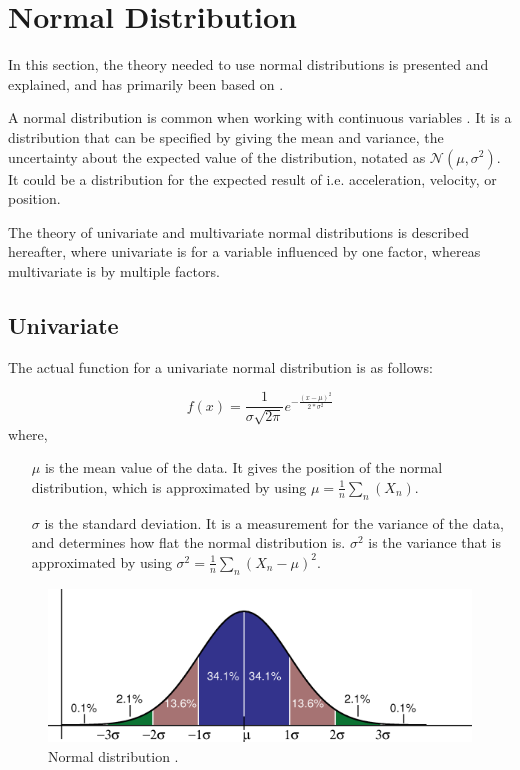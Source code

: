 \section{Normal Distribution}\label{section:normal-distribution}
In this section, the theory needed to use normal distributions is presented and explained, and has primarily been based on \citet{article:Lauritzen, article:thiesson}.

A normal distribution is common when working with continuous variables \citep{misc:artificial-intelligence}. 
It is a distribution that can be specified by giving the mean and variance, the uncertainty about the expected value of the distribution, notated as $\mathcal{N}(\mu, \sigma^2)$. 
It could be a distribution for the expected result of i.e. acceleration, velocity, or position.

The theory of univariate and multivariate normal distributions is described hereafter, where univariate is for a variable influenced by one factor, whereas multivariate is by multiple factors. 

\subsection{Univariate}
The actual function for a univariate normal distribution is as follows:

\begin{equation}\label{eq:normaldist}
	f(x) = \frac{1}{\sigma \sqrt{2\pi}}e^{-\frac{(x - \mu)^2}{2 * \sigma^2}}
\end{equation}
where, 
\begin{itemize}
	\item[$\mu$] is the mean value of the data. It gives the position of the normal distribution, which is approximated by using $\mu = \frac{1}{n}\sum\limits_{n}\left(X_n\right)	$.
	\item[$\sigma$] is the standard deviation. It is a measurement for the variance of the data, and determines how flat the normal distribution is. $\sigma ^2$ is the variance that is approximated by using $\sigma^2 = \frac{1}{n}\sum\limits_{n}\left( X_n - \mu \right)^2$.
\end{itemize}

\begin{figure}[h]
	\centering
	\includegraphics[scale=2]{media/Theory/stddev}
	\caption{Normal distribution \citep{book:gaussian}.}
	\label{fig:stddev}
\end{figure}

